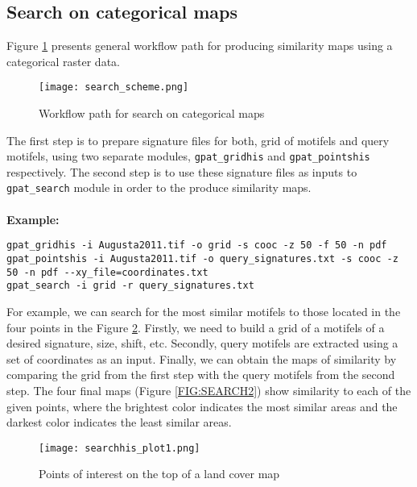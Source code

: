 \subsection{Search on categorical maps}
Figure \ref{FIG:SEARCH} presents general workflow path for producing similarity maps using a categorical raster data. 

\begin{figure}[H]
	\centering
	\texttt{[image: search\_scheme.png]}
	\caption{Workflow path for search on categorical maps}
	\label{FIG:SEARCH}
\end{figure}

The first step is to prepare signature files for both, grid of motifels and query motifels, using two separate modules, {\tt gpat\_gridhis} and {\tt gpat\_pointshis} respectively. 
The second step is to use these signature files as inputs to {\tt gpat\_search} module in order to the produce similarity maps.\\\\

{\bf Example:}

\begin{minipage}{\linewidth}
\begin{lstlisting}
gpat_gridhis -i Augusta2011.tif -o grid -s cooc -z 50 -f 50 -n pdf
gpat_pointshis -i Augusta2011.tif -o query_signatures.txt -s cooc -z 50 -n pdf --xy_file=coordinates.txt
gpat_search -i grid -r query_signatures.txt
\end{lstlisting}
\end{minipage}

For example, we can search for the most similar motifels to those located in the four points in the Figure \ref{FIG:SEARCH1}. 
Firstly, we need to build a grid of a motifels of a desired signature, size, shift, etc. 
Secondly, query motifels are extracted using a set of coordinates as an input. 
Finally, we can obtain the maps of similarity by comparing the grid from the first step with the query motifels from the second step.
The four final maps (Figure \ref{FIG:SEARCH2}) show similarity to each of the given points, where the brightest color indicates the most similar areas and the darkest color indicates the least similar areas.

\begin{figure}[H]
	\centering
	\texttt{[image: searchhis\_plot1.png]}
	\caption{Points of interest on the top of a land cover map}
	\label{FIG:SEARCH1}
\end{figure}

